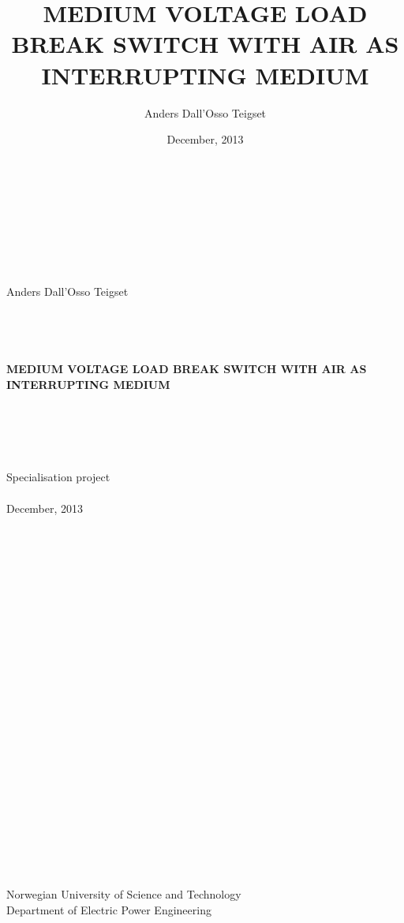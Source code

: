 \documentclass[10pt,b5paper,twoside]{article}
\author{Anders Dall'Osso Teigset}
\title{MEDIUM VOLTAGE LOAD BREAK SWITCH WITH AIR AS INTERRUPTING MEDIUM}
\date{December, 2013}
\begin{document}
    \begin{titlepage}
    \begin{center}
    \ \\
    \ \\
    \ \\
    \ \\
    \ \\
    \ \\
    Anders Dall'Osso Teigset \\
    \ \\
    \ \\
    \ \\
    \ \\{\large \bfseries
    MEDIUM VOLTAGE LOAD BREAK SWITCH WITH AIR AS INTERRUPTING MEDIUM\\
    }
    \ \\
    \ \\
    \ \\
    \ \\
    \ \\
    {\large
    Specialisation project\\
    }
    \ \\
    {December, 2013 \\}
    \ \\
    \ \\
    \ \\
    \ \\
    \ \\
    \ \\
    \ \\
    \ \\
    \ \\
    \ \\
    \ \\
    \ \\
    \ \\
    \ \\
    \ \\
    \ \\
    \ \\
    \ \\
    \ \\
    \ \\
    \ \\
    \ \\
    \ \\
    \ \\
   	{\large
   Norwegian University of Science and Technology\\
   Department of Electric Power Engineering\\
    }
   	\ \\
    \ \\
    \end{center}
    \end{titlepage}
\end{document}
